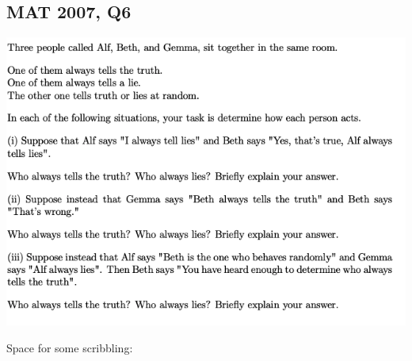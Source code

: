 \documentclass[12pt]{article}
\begin{document}
\subsection{MAT 2007, Q6}
\begin{center}
    \includegraphics[scale=0.57]{mat07-6.png}
\end{center}

Space for some scribbling:
\end{document}
